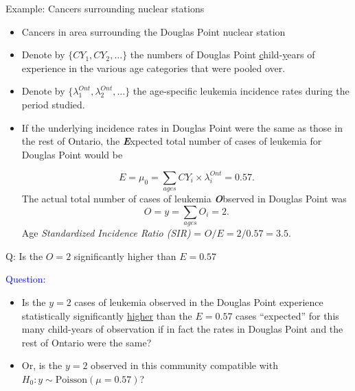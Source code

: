 \documentclass[handout]{beamer}\usepackage[]{graphicx}\usepackage[]{color}
\newcommand{\blue}[1]{\textcolor{blue}{#1}}
\begin{document}
\begin{frame}{Example: Cancers surrounding nuclear stations}
\small

\begin{itemize}
\setlength\itemsep{.3em}
\item Cancers in area surrounding the Douglas Point nuclear station \pause
\item Denote by $\{CY_{1},CY_{2}, \dots \}$ the numbers of Douglas Point \underline{c}hild-\underline{y}ears of experience in the various age categories that were pooled over.  
\item Denote by $\{\lambda^{Ont}_{1}, \lambda^{Ont}_{2},  \dots \}$ the age-specific leukemia incidence rates during the period studied. \pause
\item If the underlying incidence rates in Douglas Point were the same as those in the rest of Ontario, the \textbf{\textit{E}}xpected total number of cases of leukemia for Douglas Point would be

$$E = \mu_{0} = \sum_{ages} CY_{i} \times \lambda^{Ont}_{i}  = 0.57.$$
\pause
The actual total number of cases of leukemia \textbf{\textit{O}}bserved in Douglas Point was 
$$O = y = \sum_{ages} O_{i}  = 2.$$
\pause
Age \textit{Standardized Incidence Ratio (SIR)} = $O/E = 2/0.57 = 3.5.$
\end{itemize}

\end{frame}





\begin{frame}{Q: Is the $O=2$ significantly higher than $E=0.57$}

\blue{Question:}

\begin{itemize}
\setlength\itemsep{1.2em}
\item Is the $y = 2$ cases of leukemia observed in the Douglas Point experience statistically significantly \underline{higher} than the $E=0.57$  cases ``expected'' for this many child-years of  observation  if in fact the rates in Douglas Point and the rest of Ontario were the same? 
\item Or, is the $y=2$ observed in this community compatible with $H_{0}: y \sim \textrm{Poisson}(\mu = 0.57)$?
\end{itemize}

\end{frame}
\end{document}
